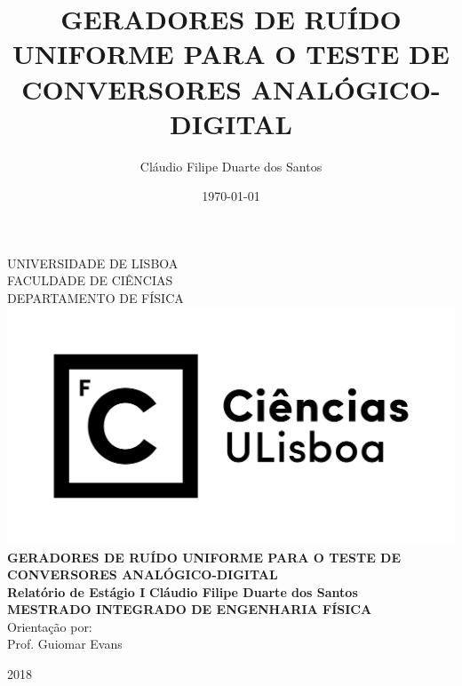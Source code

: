 \documentclass[11pt,openright,twoside]{report}
\newcommand{\TITULO}{GERADORES DE RUÍDO UNIFORME PARA O TESTE DE CONVERSORES ANALÓGICO-DIGITAL}
\newcommand{\Autor}{Cláudio Filipe Duarte dos Santos}
\newcommand{\Orientador}{Guiomar Evans}
\newcommand{\CoOrientador}{Nome Completo do Co-Orientador} %
\newcommand{\SupervisorInstituicao}{Nome Completo do Supervisor}  %
\newcommand{\Ano}{\Large{2018}}
\newcommand{\MESTRADO}{MESTRADO INTEGRADO DE ENGENHARIA FÍSICA}
\newcommand{\IdiomaTese}{\selectlanguage{portuguese}}
\numberwithin{equation}{chapter}
\begin{document}
\title{\TITULO}
\author{\Autor}
\date{\today}


\pagestyle{empty}

\begin{center}
\vspace{1cm}\normalfont\normalfont
\vfill
\textsc{\normalsize\uppercase{Universidade de Lisboa}}\\
\normalsize\uppercase{Faculdade de Ciências}\\
\normalsize\uppercase{Departamento de Física}\\
\vspace{1cm}
\includegraphics[scale=.45]{images/logo_fcul.png}\\

\vspace{2.5cm}
\vfill
\IdiomaTese
\Large{\bf \TITULO}\\
\vspace{1.3cm}
\normalsize{\bf{Relatório de Estágio I}}
\vspace{1cm}
\vfill
\Large{\bf \Autor}\\
\vspace{1,8 cm}
\vfill
\large{\bf{\MESTRADO}}\\
\vspace{2.3cm}
\vfill
\large{Orientação por:}\\
\large{Prof. \Orientador} \\
\vspace{1.5 cm}
\vfill

\vfill
\Ano
\end{center}
\end{document}
